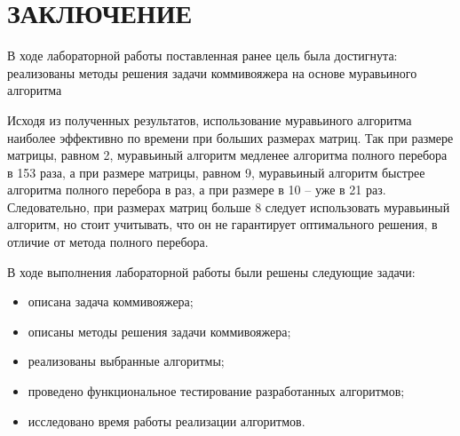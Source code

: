 \chapter*{ЗАКЛЮЧЕНИЕ}

В ходе лабораторной работы поставленная ранее цель была достигнута:
реализованы методы решения задачи коммивояжера на основе муравьиного алгоритма

Исходя из полученных результатов, использование муравьиного алгоритма наиболее эффективно по времени при больших размерах матриц. Так при размере матрицы, равном 2, муравьиный алгоритм медленее алгоритма полного перебора в 153 раза, а при размере матрицы, равном 9, муравьиный алгоритм быстрее алгоритма полного перебора в раз, а при размере в 10 -- уже в 21 раз. Следовательно, при размерах матриц больше 8 следует использовать муравьиный алгоритм, но стоит учитывать, что он не гарантирует оптимального решения, в отличие от метода полного перебора.


В ходе выполнения лабораторной работы были решены следующие задачи:

\begin{itemize}
	\item описана задача коммивояжера;
	\item описаны методы решения задачи коммивояжера;
	\item реализованы выбранные алгоритмы;
	\item проведено функциональное тестирование разработанных алгоритмов;
	\item исследовано время работы реализации алгоритмов. 
\end{itemize}

